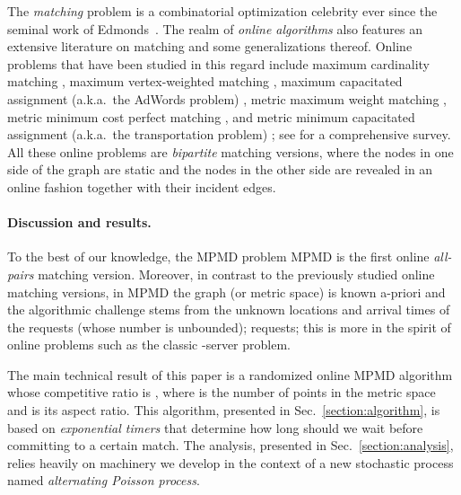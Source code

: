 \documentclass[11pt]{article}
\def\LongVersion{}
\def\LongVersionEnd{}
\def\ShortVersion{}
\def\ShortVersionEnd{}
\theoremstyle{definition}
\theoremstyle{plain}
\theoremstyle{definition}
\theoremstyle{plain}
\theoremstyle{definition}
\theoremstyle{plain}
\newcommand{\Sect}{Sec.}
\begin{document}
The \emph{matching} problem is a combinatorial optimization celebrity ever
since the seminal work of Edmonds~\cite{Edmonds1965a,Edmonds1965b}.
The realm of \emph{online algorithms} also features an extensive literature on
matching and some generalizations thereof.
Online problems that have been studied in this regard include
maximum cardinality matching
\cite{KarpVV1990,BirnbaumM2008,GoelM2008,DevanurJK2013,Miyazaki2014,NaorW2015},
maximum vertex-weighted matching
\cite{AggarwalGKM2011,DevanurJK2013,NaorW2015},
maximum capacitated assignment (a.k.a.\ the AdWords problem)
\cite{MehtaSVV2005,BuchbinderJN2007,GoelM2008,AggarwalGKM2011,NaorW2015},
metric maximum weight matching
\cite{KalyanasundaramP1993,KhullerMV1994},
metric minimum cost perfect matching
\cite{KalyanasundaramP1993,MeyersonNP2006,BansalBGN2014}, and
metric minimum capacitated assignment (a.k.a.\ the transportation
problem) \cite{KalyanasundaramP2000};
see \cite{Mehta2013} for a comprehensive survey.
All these online problems are \emph{bipartite} matching versions, where the
nodes in one side of the graph are static and the nodes in the other side are
revealed in an online fashion together with their incident edges.

\paragraph{Discussion and results.}
To the best of our knowledge,
\LongVersion the MPMD problem
\LongVersionEnd \ShortVersion MPMD
\ShortVersionEnd is the first online
\emph{all-pairs} matching version.
Moreover, in contrast to the previously studied online matching versions, in
MPMD the graph (or metric space) is known a-priori and the algorithmic
challenge stems from the unknown locations and arrival times of the
\LongVersion requests (whose number is unbounded);
\LongVersionEnd \ShortVersion requests;
\ShortVersionEnd this is more in the spirit of online problems such as the classic -server
problem.

\ShortVersion \sloppy \ShortVersionEnd
The main
\LongVersion technical \LongVersionEnd
result of this paper is a randomized online MPMD algorithm
whose competitive ratio is
,
where  is the number of points in the metric space  and
 is its aspect ratio.
This algorithm, presented in \Sect{}~\ref{section:algorithm}, is based on
\emph{exponential timers} that determine how long should we wait before
committing to a certain match.
The analysis, presented in \Sect{}~\ref{section:analysis}, relies heavily on
machinery we develop in the context of a new stochastic process named
\emph{alternating Poisson process}.
\ShortVersion \par\fussy \ShortVersionEnd
\end{document}
